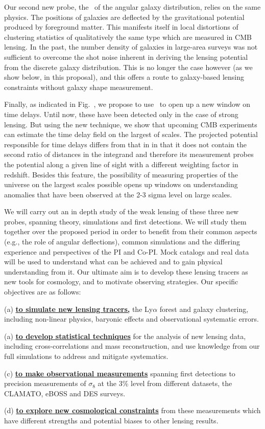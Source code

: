 Our second new probe, the \atf\ 
of the angular galaxy distribution,
relies on the same physics. The positions
of galaxies are deflected by the gravitational potential produced by
foreground matter. This manifests itself in local distortions of
clustering statistics of qualitatively 
the same type which are measured in CMB lensing.
In the past, the number density of galaxies in large-area surveys 
was not sufficient to overcome the shot noise inherent in deriving
the lensing potential from the discrete galaxy distribution. This is
no longer the case however (as we show below, in this proposal), and
this offers a route to galaxy-based lensing constraints without
galaxy shape measurement.

Finally, as indicated in Fig.~, we propose to use \atf\ to open up a new window on time delays. Until now, these have been detected only in the case of strong lensing. But using the new technique, we show that upcoming CMB experiments can estimate the time delay field on the largest of scales. The projected potential responsible for time delays differs from that in  in that it does not contain the second ratio of distances in the integrand and therefore its measurement probes the potential along a given line of sight with a different weighting factor in redshift. Besides this feature, the possibility of measuring properties of the universe on the largest scales possible opens up windows on understanding anomalies that have been observed at the 2-3 sigma level on large scales. 

We will carry out an in depth study of 
the weak lensing of these three new probes, spanning theory, 
simulations and first detections. 
We will study them together over the proposed period in order to benefit from
their common aspects (e.g., the role of angular deflections), common
simulations and
the differing experience and perspectives of the PI and Co-PI.
Mock catalogs and  real 
data will be used
 to understand what can be achieved and to gain physical understanding
from it. Our ultimate aim is to develop these lensing tracers as new tools
for cosmology, and to motivate 
observing strategies.
Our specific objectives are as follows:

(a) {\bf \underline{to simulate new lensing tracers,}} the Ly$\alpha$ forest and galaxy clustering,
 including non-linear physics, baryonic effects and observational
systematic errors.

(a) {\bf \underline{to develop statistical techniques}} for the analysis of new lensing data, including 
cross-correlations and mass reconstruction, and use knowledge from our full simulations to address and mitigate systematics.


(c) {\bf \underline{to make observational measurements}} spanning first 
detections to precision measurements of $\sigma_{8}$ at the 3\% level 
from different datasets, the CLAMATO, eBOSS and DES surveys.

(d) {\bf \underline{to explore new cosmological constraints}} from these
measurements which have different strengths and potential biases  to other
lensing results.

